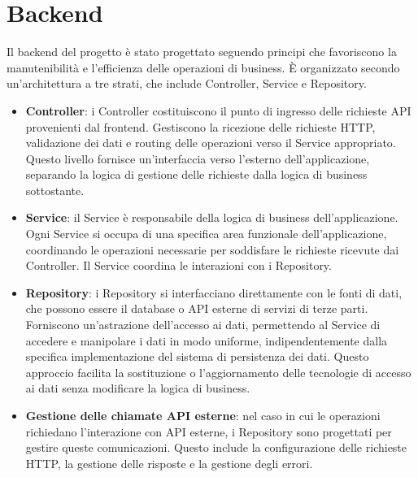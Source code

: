 \section{Backend}
Il backend del progetto è stato progettato seguendo principi che favoriscono la manutenibilità 
e l'efficienza delle operazioni di business. È organizzato secondo un'architettura a tre strati, che include Controller, 
Service e Repository.

\begin{itemize}

\item \textbf{Controller}: i Controller costituiscono il punto di ingresso delle richieste API provenienti dal frontend. 
Gestiscono la ricezione delle richieste HTTP, validazione dei dati e routing delle operazioni verso il Service appropriato. 
Questo livello fornisce un'interfaccia verso l'esterno dell'applicazione, separando la logica di gestione delle richieste 
dalla logica di business sottostante.

\item \textbf{Service}: il Service è responsabile della logica di business dell'applicazione. 
Ogni Service si occupa di una specifica area funzionale dell'applicazione, coordinando le operazioni necessarie per soddisfare 
le richieste ricevute dai Controller. Il Service coordina le interazioni con i Repository.

\item \textbf{Repository}: i Repository si interfacciano direttamente con le fonti di dati, che possono essere il database  
o API esterne di servizi di terze parti. Forniscono un'astrazione dell'accesso ai dati, permettendo al Service di accedere e manipolare 
i dati in modo uniforme, indipendentemente dalla specifica implementazione del sistema di persistenza dei dati. 
Questo approccio facilita la sostituzione o l'aggiornamento delle tecnologie di accesso ai dati senza modificare la 
logica di business.

\item \textbf{Gestione delle chiamate API esterne}: nel caso in cui le operazioni richiedano l'interazione con API esterne, 
i Repository sono progettati per gestire queste comunicazioni. Questo include la configurazione delle richieste HTTP, 
la gestione delle risposte e la gestione degli errori.

\end{itemize}